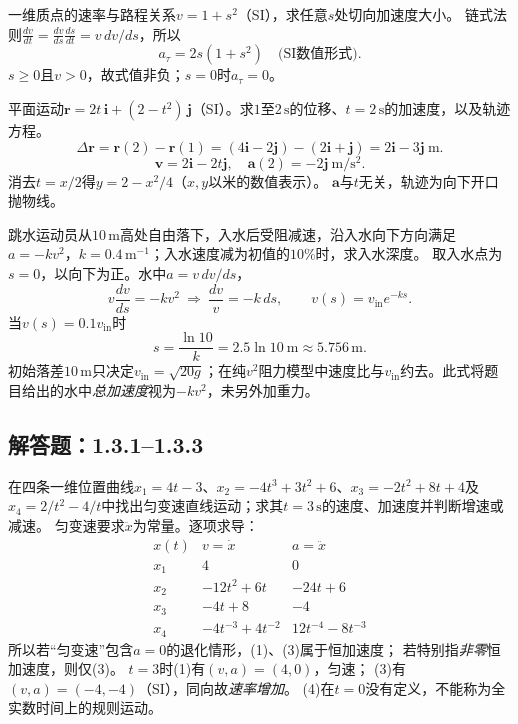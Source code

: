 \problemtext 一维质点的速率与路程关系$v=1+s^2$（SI），求任意$s$处切向加速度大小。
\workings
链式法则$\frac{dv}{dt}=\frac{dv}{ds}\frac{ds}{dt}=v\,dv/ds$，所以
\[
\boxed{a_\tau=2s(1+s^2)}\quad\text{(SI数值形式)}.
\]
\crosscheck $s\ge0$且$v>0$，故式值非负；$s=0$时$a_\tau=0$。

\problemtext 平面运动$\bm r=2t\,\bm i+(2-t^2)\,\bm j$（SI）。求$1$至$2\,\mathrm s$的位移、$t=2\,\mathrm s$的加速度，以及轨迹方程。
\workings
\[
\Delta\bm r=\bm r(2)-\bm r(1)
 =(4\bm i-2\bm j)-(2\bm i+\bm j)
 =\boxed{2\bm i-3\bm j\ \mathrm m}.
\]
\[
\bm v=2\bm i-2t\bm j,\quad
\boxed{\bm a(2)=-2\bm j\ \mathrm{m/s^2}}.
\]
消去$t=x/2$得$\boxed{y=2-x^2/4}$（$x,y$以米的数值表示）。
\crosscheck $\bm a$与$t$无关，轨迹为向下开口抛物线。

\problemtext 跳水运动员从$10\,\mathrm m$高处自由落下，入水后受阻减速，沿入水向下方向满足$a=-kv^2$，$k=0.4\,\mathrm{m^{-1}}$；入水速度减为初值的$10\%$时，求入水深度。
\workings
取入水点为$s=0$，以向下为正。水中$a=v\,dv/ds$，
\[
v\frac{dv}{ds}=-kv^2 \ \Longrightarrow\
\frac{dv}{v}=-k\,ds,\qquad
v(s)=v_{\mathrm{in}}e^{-ks}.
\]
当$v(s)=0.1v_{\mathrm{in}}$时
\[
\boxed{s=\frac{\ln10}{k}=2.5\ln10\ \mathrm m\approx5.756\,\mathrm m}.
\]
\crosscheck 初始落差$10\,\mathrm m$只决定$v_{\mathrm{in}}=\sqrt{20g}$；在纯$v^2$阻力模型中速度比与$v_{\mathrm{in}}$约去。此式将题目给出的水中\emph{总加速度}视为$-kv^2$，未另外加重力。

\subsection{解答题：1.3.1--1.3.3}
\problemtext 在四条一维位置曲线$x_1=4t-3$、$x_2=-4t^3+3t^2+6$、$x_3=-2t^2+8t+4$及$x_4=2/t^2-4/t$中找出匀变速直线运动；求其$t=3\,\mathrm s$的速度、加速度并判断增速或减速。
\workings
匀变速要求$\ddot x$为常量。逐项求导：
\[
\begin{array}{l|l|l}
x(t)&v=\dot x&a=\ddot x\\ \hline
x_1&4&0\\
x_2&-12t^2+6t&-24t+6\\
x_3&-4t+8&-4\\
x_4&-4t^{-3}+4t^{-2}&12t^{-4}-8t^{-3}
\end{array}
\]
所以若“匀变速”包含$a=0$的退化情形，(1)、(3)属于恒加速度；
若特别指\emph{非零}恒加速度，则仅(3)。
$t=3$时(1)有$(v,a)=(4,0)$，匀速；
(3)有$(v,a)=(-4,-4)$（SI），同向故\emph{速率增加}。
\crosscheck (4)在$t=0$没有定义，不能称为全实数时间上的规则运动。

